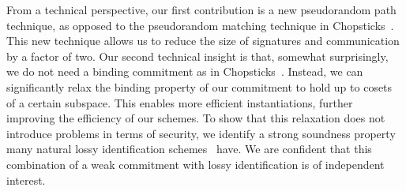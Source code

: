 \documentclass[version=final]{iacrcc}
\theoremstyle{mytheorem}				\newtheorem{theorem}{Theorem}
\theoremstyle{myplain}
\theoremstyle{mydefinition}
\theoremstyle{myremark}
\begin{document}
From a technical perspective, our first contribution is a new pseudorandom path technique, as opposed to the pseudorandom matching technique in Chopsticks~\cite{EC:PanWag23}.
This new technique allows us to reduce the size of signatures and communication by a factor of two.
Our second technical insight is that, somewhat surprisingly, we do not need a binding commitment as in Chopsticks~\cite{EC:PanWag23}. 
Instead, we can significantly relax the binding property of our commitment to hold up to cosets of a certain subspace.
This enables more efficient instantiations, further improving the efficiency of our schemes.
To show that this relaxation does not introduce problems in terms of security, we identify a strong soundness property many natural lossy identification schemes~\cite{CCS:KatWan03,EC:AFLT12,C:KilMasPan16} have.
We are confident that this combination of a weak commitment with lossy identification is of independent interest.
\end{document}
